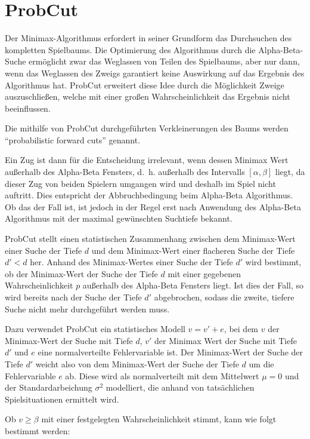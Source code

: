 \section{ProbCut}
\label{sec:probcut}

Der Minimax-Algorithmus erfordert in seiner Grundform das Durchsuchen des kompletten Spielbaums. Die Optimierung des
Algorithmus durch die Alpha-Beta-Suche ermöglicht zwar das Weglassen von Teilen des Spielbaums, aber nur dann, wenn das
Weglassen des Zweigs garantiert keine Auswirkung auf das Ergebnis des Algorithmus hat. ProbCut erweitert diese Idee
durch die Möglichkeit Zweige auszuschließen, welche mit einer großen Wahrscheinlichkeit das Ergebnis nicht beeinflussen.

Die mithilfe von ProbCut durchgeführten Verkleinerungen des Baums werden "`probabilistic forward cuts"' genannt.

Ein Zug ist dann für die Entscheidung irrelevant, wenn dessen Minimax Wert außerhalb des Alpha-Beta Fensters, d. h.
außerhalb des Intervalls \([\alpha,\beta]\) liegt, da dieser Zug von beiden Spielern umgangen wird und deshalb im Spiel
nicht auftritt. Dies entspricht der Abbruchbedingung beim Alpha-Beta Algorithmus. Ob das der Fall ist, ist jedoch in der
Regel erst nach Anwendung des Alpha-Beta Algorithmus mit der maximal gewünschten Suchtiefe bekannt.

ProbCut stellt einen statistischen Zusammenhang zwischen dem Minimax-Wert einer Suche der Tiefe \(d\) und dem
Minimax-Wert einer flacheren Suche der Tiefe \(d'<d\) her. Anhand des Minimax-Wertes einer Suche der Tiefe \(d'\) wird
bestimmt, ob der Minimax-Wert der Suche der Tiefe \(d\) mit einer gegebenen Wahrscheinlichkeit \(p\) außerhalb des
Alpha-Beta Fensters liegt. Ist dies der Fall, so wird bereits nach der Suche der Tiefe \(d'\) abgebrochen, sodass die
zweite, tiefere Suche nicht mehr durchgeführt werden muss.

Dazu verwendet ProbCut ein statistisches Modell \(v=v'+e\), bei dem \(v\) der Minimax-Wert der Suche mit Tiefe \(d\),
\(v'\) der Minimax Wert der Suche mit Tiefe \(d'\) und \(e\) eine normalverteilte Fehlervariable ist. Der Minimax-Wert
der Suche der Tiefe \(d'\) weicht also von dem Minimax-Wert der Suche der Tiefe \(d\) um die Fehlervariable \(e\) ab.
Diese wird als normalverteilt mit dem Mittelwert $\mu=0$ und der Standardarbeichung \(\sigma^2\) modelliert, die anhand
von tatsächlichen Spielsituationen ermittelt wird.

Ob $v\geq\beta$ mit einer festgelegten Wahrscheinlichkeit stimmt, kann wie folgt bestimmt werden:

